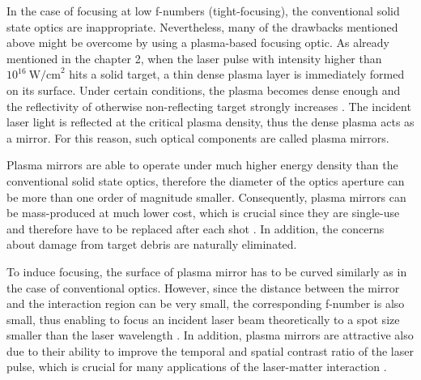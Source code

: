 In the case of focusing at low f-numbers (tight-focusing), the conventional solid state optics are inappropriate. Nevertheless, many of the drawbacks mentioned above might be overcome by using a plasma-based focusing optic. As already mentioned in the chapter 2, when the laser pulse with intensity higher than $ 10^{16} \ \mathrm{W/cm}^{2} $ hits a solid target, a thin dense plasma layer is immediately formed on its surface. Under certain conditions, the plasma becomes dense enough and the reflectivity of otherwise non-reflecting target strongly increases \cite{Wilson2016}. The incident laser light is reflected at the critical plasma density, thus the dense plasma acts as a mirror. For this reason, such optical components are called plasma mirrors.

Plasma mirrors are able to operate under much higher energy density than the conventional solid state optics, therefore the diameter of the optics aperture can be more than one order of magnitude smaller. Consequently, plasma mirrors can be mass-produced at much lower cost, which is crucial since they are single-use and therefore have to be replaced after each shot \cite{Fuchs2014}. In addition, the concerns about damage from target debris are naturally eliminated.

To induce focusing, the surface of plasma mirror has to be curved similarly as in the case of conventional optics. However, since the distance between the mirror and the interaction region can be very small, the corresponding f-number is also small, thus enabling to focus an incident laser beam theoretically to a spot size smaller than the laser wavelength \cite{Nakatsutsumi2010}. In addition, plasma mirrors are attractive also due to their ability to improve the temporal and spatial contrast ratio of the laser pulse, which is crucial for many applications of the laser-matter interaction \cite{Kon2010, Borot2014, Geissel2011, Dromey2004}.

